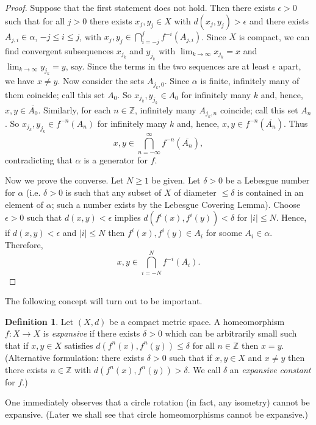 \documentclass[12pt]{article}
\theoremstyle{definition}
\newtheorem{definition}[theorem]{Definition}
\theoremstyle{remark}
\begin{document}
\begin{proof}
Suppose that the first statement does not hold. Then there exists $\epsilon>0$ such that 
for all $j>0$ there exists $x_j,y_j \in X$ with $d(x_j,y_j)>\epsilon$ and there exists $A_{j,i} \in \alpha$,
$-j \le i \le j$, with $x_j,y_j \in \bigcap_{i=-j}^j f^{-i}(A_{j,i})$.
Since $X$ is compact, we can find convergent subsequences $x_{j_k}$ and $y_{j_k}$ with
$\lim_{k \to \infty} x_{j_k} = x$ and $\lim_{k \to \infty} y_{j_k} =y$, say. Since the terms in the two sequences are at least $\epsilon$ apart, we have $x \ne y$.
Now consider the sets $A_{j_k,0}$. Since $\alpha$ is finite, infinitely many of them coincide; call this set $A_0$. So $x_{j_k},y_{j_k} \in A_0$ for infinitely many $k$ and, hence,
$x,y \in \overline{A_0}$. Similarly, for each $n \in \mathbb Z$, infinitely many $A_{j_k,n}$ coincide; call this set $A_n$. 
So $x_{j_k},y_{j_k} \in f^{-n}(A_n)$ for infinitely many $k$ and, hence,
$x,y \in f^{-n}(\overline{A_n})$. Thus
\[
x,y \in \bigcap_{n = -\infty}^\infty f^{-n}(\overline{A_n}),
\]
contradicting that $\alpha$ is a generator for $f$.

Now we prove the converse. Let $N \ge 1$ be given. Let $\delta>0$ be a Lebesgue number for 
$\alpha$ (i.e. $\delta>0$ is such that any subset of $X$ of diameter $\le \delta$ is contained in an element of $\alpha$; such a number exists by the Lebesgue Covering Lemma). Choose 
$\epsilon>0$ such that
$d(x,y)<\epsilon$ implies $d(f^i(x),f^i(y))< \delta$ for $| i |\le N$.
Hence, if $d(x,y)<\epsilon$ and $|i| \le N$ then $f^{i}(x),f^i(y) \in A_i$ for soome $A_i \in \alpha$.
Therefore,
\[
x,y \in \bigcap_{i=-N}^N f^{-i}(A_i).
\]
\end{proof}

The following concept will turn out to be important.

\begin{definition}
Let $(X,d)$ be a compact metric space.
A homeomorphism $f : X \to X$ is {\it expansive} if there exists $\delta>0$ which can be arbitrarily small such that if $x,y \in X$
satisfies
$d(f^n(x),f^n(y)) \le \delta$ for all $n \in \mathbb Z$ then $x=y$.
(Alternative formulation: there exists $\delta>0$ such that if $x,y \in X$ and $x \ne y$ then there exists $n \in \mathbb Z$ with $d(f^n(x),f^n(y))>\delta$. We call $\delta$ an {\it expansive constant} for $f$.) 
\end{definition}

One immediately observes that a circle rotation (in fact, any isometry)  cannot
be expansive. (Later we shall see that circle homeomorphisms cannot be expansive.)
\end{document}
